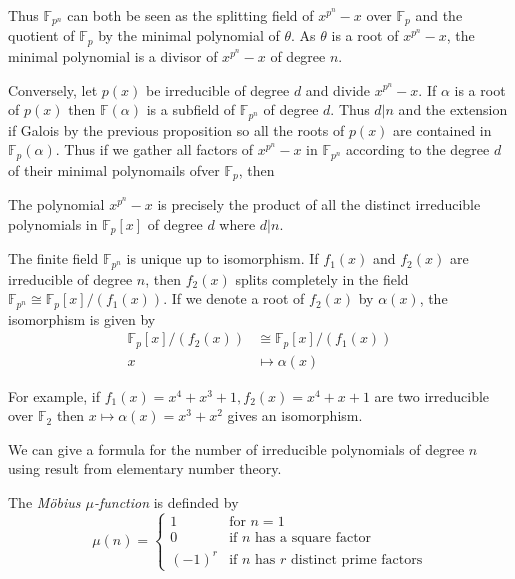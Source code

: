 \documentclass[a4paper]{article}
\begin{document}
Thus $\mathbb F_{p^n}$ can both be seen as the splitting field of $x^{p^n}-x$ over $\mathbb F_p$ and the quotient of $\mathbb F_p$ by the minimal polynomial of $\theta$. As $\theta$ is a root of $x^{p^n}-x$, the minimal polynomial is a divisor of $x^{p^n}-x$ of degree $n$.

Conversely, let $p(x)$ be irreducible of degree $d$ and divide $x^{p^n}-x$. If $\alpha$ is a root of $p(x)$ then $\mathbb F(\alpha)$ is a subfield of $\mathbb F_{p^n}$ of degree $d$. Thus $d|n$ and the extension if Galois by the previous proposition so all the roots of $p(x)$ are contained in $\mathbb F_p(\alpha)$. Thus if we gather all factors of $x^{p^n}-x$ in $\mathbb F_{p^n}$ according to the degree $d$ of their minimal polynomails ofver $\mathbb F_p$, then

\begin{prop}
  The polynomial $x^{p^n}-x$ is precisely the product of all the distinct irreducible polynomials in $\mathbb F_p[x]$ of degree $d$ where $d|n$.
\end{prop}

\begin{eg}
  The finite field $\mathbb F_{p^n}$ is unique up to isomorphism. If $f_1(x)$ and $f_2(x)$ are irreducible of degree $n$, then $f_2(x)$ splits completely in the field $\mathbb F_{p^n} \cong \mathbb F_p[x]/(f_1(x))$. If we denote a root of $f_2(x)$ by $\alpha(x)$, the isomorphism is given by
  \begin{align*}
    \mathbb F_p[x]/(f_2(x)) & \cong \mathbb F_p[x]/(f_1(x)) \\
    x & \mapsto \alpha(x)
  \end{align*}

  For example, if $f_1(x) = x^4+x^3+1, f_2(x) = x^4+x+1$ are two irreducible over $\mathbb F_2$ then $x \mapsto \alpha(x) = x^3+x^2$ gives an isomorphism.
\end{eg}

We can give a formula for the number of irreducible polynomials of degree $n$ using result from elementary number theory.

\begin{defi}
  The \emph{M\"obius $\mu$-function} is definded by
  \[
    \mu (n) =  
  \begin{cases}
    1 & \text{for } n = 1 \\
    0 & \text{if $n$ has a square factor} \\
    (-1)^r & \text{if $n$ has $r$ distinct prime factors}
  \end{cases}
  \]
\end{defi}
\end{document}
